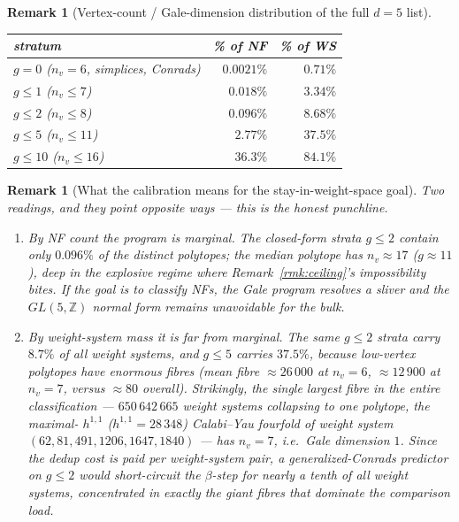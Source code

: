 \documentclass{amsart}
\newtheorem{remark}[theorem]{Remark}
\begin{document}
\begin{remark}[Vertex-count / Gale-dimension distribution of the full $d=5$
list]
\begin{center}
\begin{tabular}{l r r}
\hline
stratum & \% of NF & \% of WS \\
\hline
$g=0$ ($n_v=6$, simplices, Conrads) & $0.0021\%$ & $0.71\%$ \\
$g\le1$ ($n_v\le7$)                 & $0.018\%$  & $3.34\%$ \\
$g\le2$ ($n_v\le8$)                 & $0.096\%$  & $8.68\%$ \\
$g\le5$ ($n_v\le11$)                & $2.77\%$   & $37.5\%$ \\
$g\le10$ ($n_v\le16$)               & $36.3\%$   & $84.1\%$ \\
\hline
\end{tabular}
\end{center}
\end{remark}

\begin{remark}[What the calibration means for the stay-in-weight-space goal]
\label{rmk:galecalib-read}
Two readings, and they point opposite ways --- this is the honest punchline.
\begin{enumerate}
  \item[\textnormal{(i)}] \emph{By NF count the program is marginal.} The
        closed-form strata $g\le2$ contain only $0.096\%$ of the distinct
        polytopes; the median polytope has $n_v\approx17$ ($g\approx11$), deep in
        the explosive regime where Remark~\ref{rmk:ceiling}'s impossibility bites.
        If the goal is to classify \emph{NFs}, the Gale program resolves a sliver
        and the $GL(5,\mathbb Z)$ normal form remains unavoidable for the bulk.
  \item[\textnormal{(ii)}] \emph{By weight-system mass it is far from marginal.}
        The same $g\le2$ strata carry $8.7\%$ of all weight systems, and
        $g\le5$ carries $37.5\%$, because low-vertex polytopes have enormous
        fibres (mean fibre $\approx26\,000$ at $n_v=6$, $\approx12\,900$ at
        $n_v=7$, versus $\approx 80$ overall). Strikingly, the
        \emph{single largest fibre in the entire classification} ---
        $650\,642\,665$ weight systems collapsing to one polytope, the maximal-
        $h^{1,1}$ ($h^{1,1}=28\,348$) Calabi--Yau fourfold of weight system
        $(62,81,491,1206,1647,1840)$ --- has $n_v=7$, i.e.\ \emph{Gale dimension
        $1$}. Since the dedup cost is paid \emph{per weight-system pair}, a
        generalized-Conrads predictor on $g\le2$ would short-circuit the
        $\beta$-step for nearly a tenth of all weight systems, concentrated in
        exactly the giant fibres that dominate the comparison load.

\end{enumerate}
\end{remark}
\end{document}
